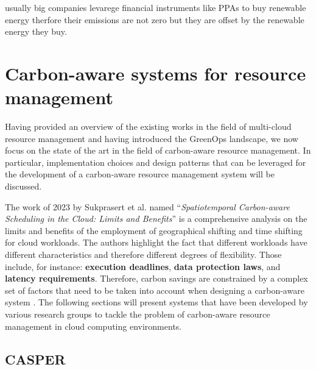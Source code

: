 usually big companies levarege financial instruments like PPAs to buy renewable energy therfore their emissions are not zero but they are offset by the renewable energy they buy.

\section{Carbon-aware systems for resource management}

Having provided an overview of the existing works in the field of multi-cloud resource management and having introduced the GreenOps landscape, we now focus on the state of the art in the field of carbon-aware resource management.
In particular, implementation choices and design patterns that can be leveraged for the development of a carbon-aware resource management system will be discussed.
\newline

The work of 2023 by Sukprasert et al. named ``\textit{Spatiotemporal Carbon-aware Scheduling in the Cloud: Limits and Benefits}'' \cite{10.1145/3599733.3606301} is a comprehensive analysis on the limits and benefits of the employment of geographical shifting and time shifting for cloud workloads.
The authors highlight the fact that different workloads have different characteristics and therefore different degrees of flexibility. Those include, for instance: \textbf{execution deadlines}, \textbf{data protection laws}, and \textbf{latency requirements}. Therefore, carbon savings are constrained by a complex set of factors that need to be taken into account when designing a carbon-aware system \cite{10.1145/3599733.3606301}.
The following sections will present systems that have been developed by various research groups to tackle the problem of carbon-aware resource management in cloud computing environments.

\subsection{CASPER}


